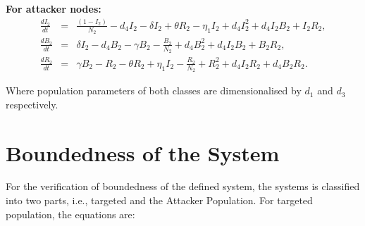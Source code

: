 {\bf For attacker nodes:}
\begin{eqnarray}
  \frac{d I_2}{dt }&=&  \frac{( 1- I_2)}{N_2}- d_4 I_2-\delta I_2 + \theta R_2 -\eta_1 I_2+ d_4 I_2^2+d_4 I_2 B_2+ I_2 R_2, \\
 \frac{d B_2}{d t}&=& \delta I_2 - d_4 B_2 -\gamma B_2- \frac{ B_2}{N_2}+d_4 B_2^2+d_4 I_2 B_2+ B_2 R_2 , \\
   \frac{d R_2}{d t} &=& \gamma B_2 - R_2 - \theta R_2+ \eta_1 I_2- \frac{ R_2}{N_2}+R_2^2+d_4 I_2 R_2+d_4 B_2 R_2 .
\end{eqnarray}

Where population parameters of both classes are dimensionalised by $d_1$ and $d_3$ respectively.
\clearpage
\section{Boundedness of the System}
For the verification of boundedness of the defined system, the systems is classified into two parts, i.e., targeted and the Attacker Population. For targeted population, the equations are:

